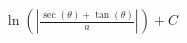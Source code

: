 \documentclass[preview]{standalone}
\begin{document}
\begin{align*}
\ln(|\frac{\sec(\theta)+\tan(\theta)}{a}|)+C
\end{align*}
\end{document}
